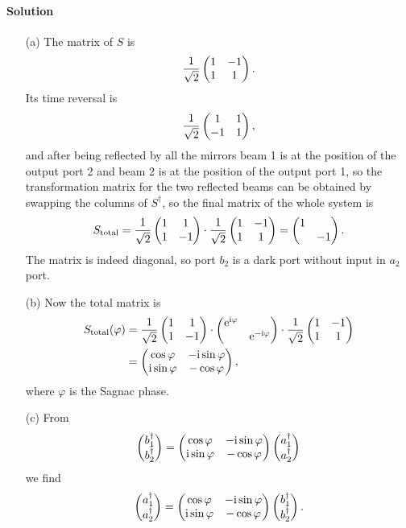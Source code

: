 \documentclass[hyperref, a4paper]{article}
\newcommand*{\ii}{\mathrm{i}}
\newcommand*{\ee}{\mathrm{e}}
\begin{document}
\paragraph{Solution} \begin{itemize}
    \item[(a)] The matrix of $S$ is 
    \[
        \frac{1}{\sqrt{2}} \pmqty{ 1 & -1 \\ 1 & 1 }.
    \]
    Its time reversal is 
    \[
        \frac{1}{\sqrt{2}} \pmqty{ 1 & 1 \\ -1 & 1 },
    \]
    and after being reflected by all the mirrors beam 1 is at the position of the output port 2 and beam 2 is at the position of the output port 1, so the transformation matrix for the two reflected beams can be obtained by swapping the columns of $S^\dagger$, so the final matrix of the whole system is 
    \begin{equation}
        S_\text{total} = \frac{1}{\sqrt{2}} \pmqty{ 1 & 1 \\ 1 & -1 } \cdot \frac{1}{\sqrt{2}} \pmqty{ 1 & -1 \\ 1 & 1 } = \pmqty{\dmat{1, -1}}.
    \end{equation} 
    The matrix is indeed diagonal, so port $b_2$ is a dark port without input in $a_2$ port.
    \item[(b)] Now the total matrix is 
    \begin{equation}
        \begin{aligned}
            S_\text{total}(\varphi) &= \frac{1}{\sqrt{2}} \pmqty{ 1 & 1 \\ 1 & -1 } \cdot \pmqty{\dmat{\ee^{\ii \varphi}, \ee^{- \ii \varphi}}} \cdot \frac{1}{\sqrt{2}} \pmqty{ 1 & -1 \\ 1 & 1 } \\
            &= \pmqty{ \cos \varphi & - \ii \sin \varphi \\ \ii \sin \varphi & - \cos \varphi },
        \end{aligned}
    \end{equation} 
    where $\varphi$ is the Sagnac phase.
    \item[(c)] From
    \[
        \pmqty{b_1^\dagger \\ b_2^\dagger} = \pmqty{ \cos \varphi & - \ii \sin \varphi \\ \ii \sin \varphi & - \cos \varphi } \pmqty{a_1^\dagger \\ a_2^\dagger}
    \]
    we find 
    \begin{equation}
        \pmqty{a_1^\dagger \\ a_2^\dagger} = \pmqty{ \cos \varphi & - \ii \sin \varphi \\ \ii \sin \varphi & - \cos \varphi } \pmqty{b_1^\dagger \\ b_2^\dagger}.

\end{equation}
\end{itemize}
\end{document}
